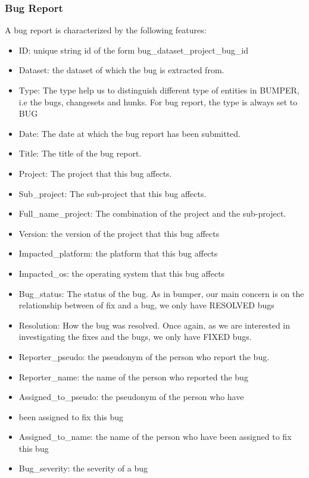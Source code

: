 \subsubsection{Bug Report}

A bug report is characterized by the following features:


\begin{itemize}

\item ID: unique string id of the form bug\_dataset\_project\_bug\_id
\item Dataset: the dataset of which the bug is extracted from.
\item Type: The type help us to distinguish different type of entities in BUMPER, i.e the bugs, changesets and hunks. For bug report, the type is always set to BUG
\item Date: The date at which the bug report has been submitted.
\item Title: The title of the bug report.
\item Project: The project that this bug affects.
\item Sub\_project: The sub-project that this bug affects.
\item Full\_name\_project: The combination of the project and the sub-project.
\item Version: the version of the project that this bug affects
\item Impacted\_platform: the platform that this bug affects
\item Impacted\_os: the operating system that this bug affects
\item Bug\_status: The status of the bug. As in bumper, our main concern is on the relationship between of fix and a bug, we only have RESOLVED bugs
\item Resolution: How the bug was resolved. Once again, as we are interested in investigating the fixes and the bugs, we only have FIXED bugs.
\item Reporter\_pseudo: the pseudonym of the person who report the bug.
\item Reporter\_name: the name of the person who reported the bug
\item Assigned\_to\_pseudo: the pseudonym of the person who have \item been assigned to fix this bug
\item Assigned\_to\_name: the name of the person who have been assigned to fix this bug
\item Bug\_severity: the severity of a bug

\end{itemize}
